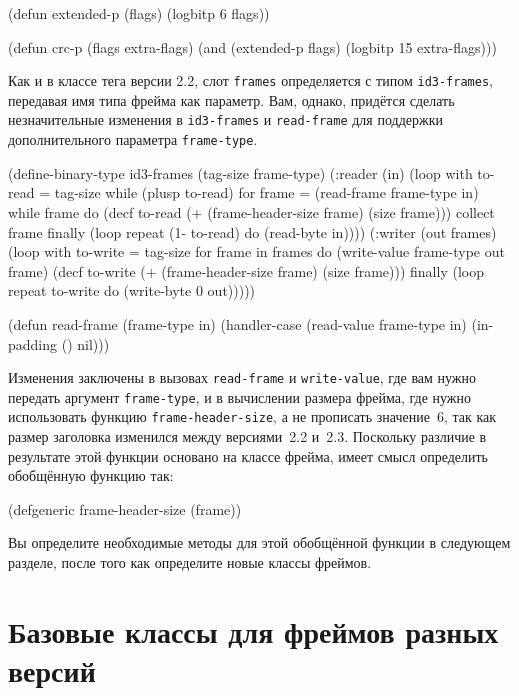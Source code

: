 \begin{myverb}
(defun extended-p (flags) (logbitp 6 flags))

(defun crc-p (flags extra-flags)
  (and (extended-p flags) (logbitp 15 extra-flags)))
\end{myverb}

Как и в классе тега версии 2.2, слот \lstinline{frames} определяется с типом \lstinline{id3-frames},
передавая имя типа фрейма как параметр. Вам, однако, придётся сделать незначительные
изменения в \lstinline{id3-frames} и \lstinline{read-frame} для поддержки дополнительного параметра
\lstinline{frame-type}.

\begin{myverb}
(define-binary-type id3-frames (tag-size frame-type)
  (:reader (in)
    (loop with to-read = tag-size
          while (plusp to-read)
          for frame = (read-frame frame-type in)
          while frame
          do (decf to-read (+ (frame-header-size frame) (size frame)))
          collect frame
          finally (loop repeat (1- to-read) do (read-byte in))))
  (:writer (out frames)
    (loop with to-write = tag-size
          for frame in frames
          do (write-value frame-type out frame)
          (decf to-write (+ (frame-header-size frame) (size frame)))
          finally (loop repeat to-write do (write-byte 0 out)))))

(defun read-frame (frame-type in)
  (handler-case (read-value frame-type in)
    (in-padding () nil)))
\end{myverb}

Изменения заключены в вызовах \lstinline{read-frame} и \lstinline{write-value}, где вам нужно
передать аргумент \lstinline{frame-type}, и в вычислении размера фрейма, где нужно использовать
функцию \lstinline{frame-header-size}, а не прописать значение~6, так как размер заголовка
изменился между версиями~2.2 и~2.3. Поскольку различие в результате этой функции основано на
классе фрейма, имеет смысл определить обобщённую функцию так:

\begin{myverb}
(defgeneric frame-header-size (frame))
\end{myverb}

Вы определите необходимые методы для этой обобщённой функции в следующем разделе, после
того как определите новые классы фреймов.

\section{Базовые классы для фреймов разных версий}

